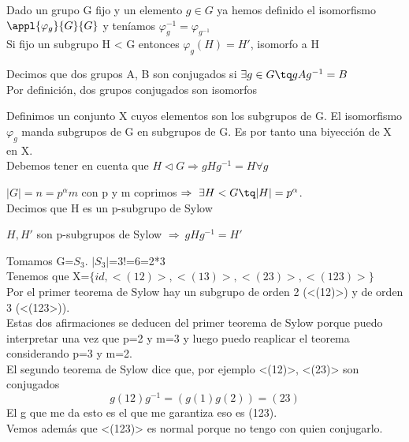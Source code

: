 \documentclass[nochap]{apuntes}
\begin{document}
Dado un grupo G fijo y un elemento $g\in G$  ya hemos definido el isomorfismo $\appl{\varphi_g}{G}{G}$  y teníamos $\varphi_{g}^{-1}=\varphi_{g^{-1}}$\\
Si fijo un subgrupo H < G entonces $\varphi_g(H)=H'$, isomorfo a H\\
\begin{defn}[Conjugado]
 Decimos que dos grupos A, B son conjugados si $\exists g \in G \tq gAg^{-1}=B$\\
 Por definición, dos grupos conjugados son isomorfos
\end{defn}

Definimos un conjunto X cuyos elementos son los subgrupos de G. El isomorfismo $\varphi_{g}$  manda subgrupos de G en subgrupos de G. 
Es por tanto una biyección de X en X.\\
Debemos tener en cuenta que $H \vartriangleleft G \Rightarrow gHg^{-1}=H \forall g$

\begin{theorem}
 $|G|=n=p^{\alpha}m$  con p y m coprimos $\Rightarrow \ \exists H < G \tq |H|=p^{\alpha}$. \\
 Decimos que H es un p-subgrupo de Sylow
\end{theorem}

\begin{theorem}
 $H, H'$  son p-subgrupos de Sylow $\Rightarrow \ gHg^{-1}=H'$
\end{theorem}

\begin{example}
 Tomamos G=$S_3$. $|S_3|$=3!=6=2*3\\
 Tenemos que X=$\{id, <(12)>, <(13)>,<(23)>,<(123)>\}$\\
 Por el primer teorema de Sylow hay un subgrupo de orden 2 (<(12)>) y de orden 3 (<(123>)).\\
 Estas dos afirmaciones se deducen del primer teorema de Sylow porque puedo interpretar una vez que p=2 y m=3 y luego puedo reaplicar
 el teorema considerando p=3 y m=2.\\
 El segundo teorema de Sylow dice que, por ejemplo <(12)>, <(23)> son conjugados\\
 \[g(12)g^{-1}=(g(1)g(2))=(23)\]
 El g que me da esto es el que me garantiza eso es (123).\\
 Vemos además que <(123)> es normal porque no tengo con quien conjugarlo.
\end{example}
\end{document}
